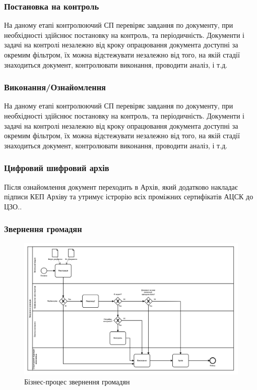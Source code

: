 \subsubsection*{Постановка на контроль}

На даному етапі контролюючий СП перевіряє завдання по документу,
при необхідності здійснює постановку на контроль, та періодичність.
Документи і задачі на контролі незалежно від кроку опрацювання
документа доступні за окремим фільтром, їх можна відстежувати
незалежно від того, на якій стадії знаходиться документ,
контролювати виконання, проводити аналіз, і т.д.

\subsubsection*{Виконання/Ознайомлення}

На даному етапі контролюючий СП перевіряє завдання по документу,
при необхідності здійснює постановку на контроль, та періодичність.
Документи і задачі на контролі незалежно від кроку опрацювання
документа доступні за окремим фільтром, їх можна відстежувати
незалежно від того, на якій стадії знаходиться документ, контролювати
виконання, проводити аналіз, і т.д.

\subsubsection*{Цифровий шифровий архів}

Після ознайомлення документ переходить в Архів, який додатково накладає
підписи КЕП Архіву та утримує істрорію всіх проміжних сертифікатів АЦСК до ЦЗО..

\subsubsection{Звернення громадян}

\begin{figure}[!htbp]
\centerline{\includegraphics[scale=0.3]{citizenInquire.png}}
\caption{Бізнес-процес звернення громадян}
\end{figure}

